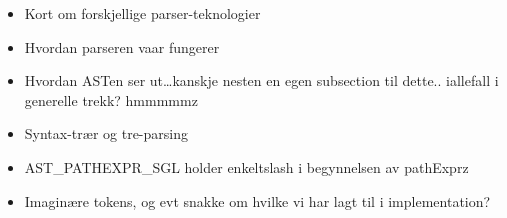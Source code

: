 \begin{itemize}
  \item Kort om forskjellige parser-teknologier
  \item Hvordan parseren vaar fungerer
  \item Hvordan ASTen ser ut\ldots kanskje nesten en egen subsection til
  dette.. iallefall i generelle trekk? hmmmmmz
  \item Syntax-tr\ae r og tre-parsing
  \item AST\_PATHEXPR\_SGL holder enkeltslash i begynnelsen av pathExprz
  \item Imagin\ae re tokens, og evt snakke om hvilke vi har lagt til i
  implementation?
\end{itemize}